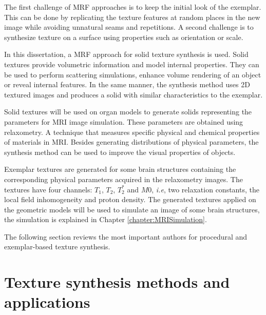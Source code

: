 The first challenge of MRF approaches is to
keep the initial look of the exemplar.
This can be done by replicating the texture features at random places in 
the new image while avoiding unnatural seams and repetitions.
A second challenge is to synthesize texture on a surface using properties 
such as orientation or scale.

In this dissertation,
a MRF approach for solid texture synthesis is used.
Solid textures provide volumetric information 
and model internal properties.
They can be used to perform scattering simulations,   
enhance volume rendering of an object or reveal
internal features.
In the same manner, the synthesis method uses 2D textured images
and produces a solid with similar characteristics to the exemplar.

Solid textures will be used on organ models
to generate solids representing
the parameters for MRI image simulation. 
These parameters are obtained using relaxometry. A technique that measures 
specific physical and chemical properties of materials in MRI.
Besides generating distributions of physical parameters,  
the synthesis method can be used 
to improve the visual properties of objects. 


Exemplar textures are generated for some brain structures 
containing the corresponding physical parameters
acquired in the relaxometry images. 
The textures have four channels: $T_1$, $T_2$, $T_2^*$ and $M0$, 
\textit{i.e}, two relaxation constants, the local field inhomogeneity and proton density. 
The generated textures applied on the geometric models 
will be used to simulate an image of some brain structures,
the simulation is explained in Chapter \ref{chapter:MRISimulation}.

The following section reviews the most important authors for 
procedural and exemplar-based texture synthesis.

\section{Texture synthesis methods and applications}

